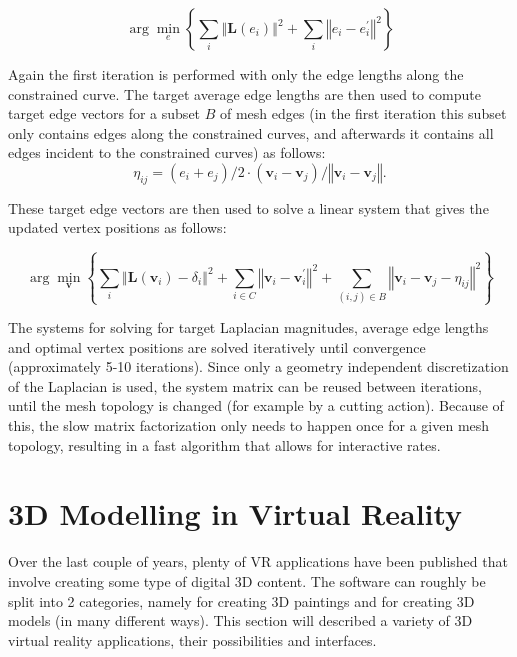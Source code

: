 \begin{equation}
\arg\min_{e} \left\lbrace \sum_{i} \left\Vert \mathbf{L}\left(e_{i}\right) \right\Vert^{2} + \sum_{i} \left\Vert e_{i} - e_{i}^{'} \right\Vert^{2} \right\rbrace
\end{equation}

Again the first iteration is performed with only the edge lengths along the constrained curve. 
The target average edge lengths are then used to compute target edge vectors for a subset $B$ of mesh edges (in the first iteration this subset only contains edges along the constrained curves, and afterwards it contains all edges incident to the constrained curves) as follows:
\begin{equation}
\eta_{ij} = \left( e_{i} + e_{j} \right) / 2 \cdot \left( \mathbf{v}_{i} - \mathbf{v}_{j} \right) / \left\Vert \mathbf{v}_{i} - \mathbf{v}_{j} \right\Vert.
\end{equation}

These target edge vectors are then used to solve a linear system that gives the updated vertex positions as follows: 

\begin{equation}
\arg\min_{\mathbf{v}} \left\lbrace \sum_{i} \left\Vert \mathbf{L}\left(\mathbf{v}_{i}\right) - \delta_{i} \right\Vert^{2} + \sum_{i \in C} \left\Vert \mathbf{v}_{i} - \mathbf{v}_{i}^{'} \right\Vert^{2} + \sum_{\left(i,j\right) \in B} \left \Vert \mathbf{v}_{i} - \mathbf{v}_{j} - \eta_{ij} \right\Vert^{2} \right\rbrace
\end{equation}

The systems for solving for target Laplacian magnitudes, average edge lengths and optimal vertex positions are solved iteratively until convergence (approximately 5-10 iterations). Since only a geometry independent discretization of the Laplacian is used, the system matrix can be reused between iterations, until the mesh topology is changed (for example by a cutting action). Because of this, the slow matrix factorization only needs to happen once for a given mesh topology, resulting in a fast algorithm that allows for interactive rates.	

\section{3D Modelling in Virtual Reality}
Over the last couple of years, plenty of VR applications have been published that involve creating some type of digital 3D content. The software can roughly be split into 2 categories, namely for creating 3D paintings  and for creating 3D models (in many different ways).  
This section will described a variety of 3D virtual reality applications, their possibilities and interfaces. 
